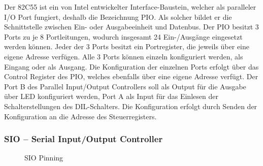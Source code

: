 Der 82C55 ist ein von Intel entwickelter Interface-Baustein, welcher als paralleler I/O Port fungiert, deshalb die Bezeichnung PIO. Als solcher bildet er die Schnittstelle zwischen Ein- oder Ausgabeeinheit und Datenbus. Der PIO besitzt 3 Ports zu je 8 Portleitungen, wodurch insgesamt 24 Ein-/Ausgänge eingesetzt werden können. Jeder der 3 Ports besitzt ein Portregister, die jeweils über eine eigene Adresse verfügen.
Alle 3 Ports können einzeln konfiguriert werden, als Eingang oder als Ausgang. Die Konfiguration der einzelnen Ports erfolgt über das Control Register des PIO, welches ebenfalls über eine eigene Adresse verfügt.
Der Port B des Parallel Input/Output Controllers soll als Output für die Ausgabe über LED konfiguriert werden, Port A als Input für das Einlesen der Schalterstellungen des DIL-Schalters. Die Konfiguration erfolgt durch Senden der Konfiguration an die Adresse des Steuerregisters.

\subsubsection{SIO -- Serial Input/Output Controller}
\begin{figure}[H]
    \qquad
    \qquad
    \caption[Z80 SIO Pinning]{SIO Pinning \cite{z80:sio}}
    \label{fig:z80-sio-pinning}
\end{figure}

